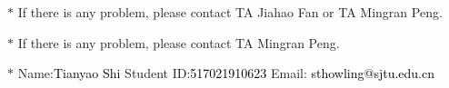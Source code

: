 \documentclass[12pt,a4paper]{article}
\theoremstyle{definition}
\begin{document}
\noindent

\noindent{}
\begin{center}
\footnotesize{\color{red}$*$ If there is any problem, please contact TA Jiahao Fan or TA Mingran Peng.}

\footnotesize{\color{red}$*$ If there is any problem, please contact TA Mingran Peng.}\par

\footnotesize{\color{blue}$*$ Name:{\textcolor{black}{Tianyao Shi}}  \quad Student ID:{\textcolor{black}{517021910623}} \quad Email: {\textcolor{black}{sthowling@sjtu.edu.cn}}}
\end{center}
\end{document}
